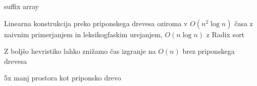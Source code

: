 suffix array



Linearna konstrukcija preko priponskega drevesa oziroma v $O(n^2\log{n})$ časa z naivnim primerjanjem in leksikogfaskim urejanjem,  $O(n\log{n})$ z Radix sort

Z boljšo hevristiko lahko znižamo čas izgranje na $O(n)$ brez priponskega drevesa\cite{Nong2009}



5x manj prostora kot priponsko drevo\cite{Manber1990}

\cite{Manber1990}